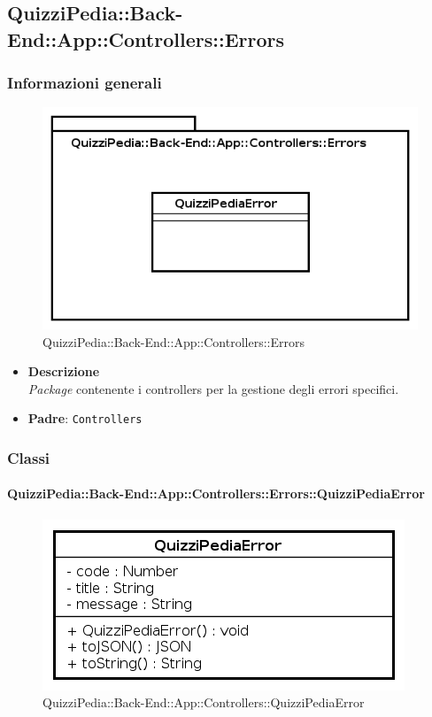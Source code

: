 \subsection{QuizziPedia::Back-End::App::Controllers::Errors}
\subsubsection{Informazioni generali}
\label{QuizziPedia::Back-End::App::Controllers::Errors}
\begin{figure}[ht]
	\centering
	\includegraphics[scale=0.45]{UML/Package/QuizziPedia_Back-End_App_Controllers_Errors.png}
	\caption{QuizziPedia::Back-End::App::Controllers::Errors}
\end{figure}
\FloatBarrier


	\begin{itemize}
		\item \textbf{Descrizione} \\
		\textit{Package} contenente i controllers per la gestione degli errori specifici.
		\item \textbf{Padre}: \texttt{Controllers}
	\end{itemize}
\subsubsection{Classi}
\paragraph{QuizziPedia::Back-End::App::Controllers::Errors::QuizziPediaError}
\begin{figure}[ht]
	\centering
	\includegraphics[scale=0.45]{UML/Classi/Back-End/QuizziPedia_Back-End_App_Controllers_Errors_QuizziPediaError.png}
	\caption{QuizziPedia::Back-End::App::Controllers::QuizziPediaError}
\end{figure}
\FloatBarrier


